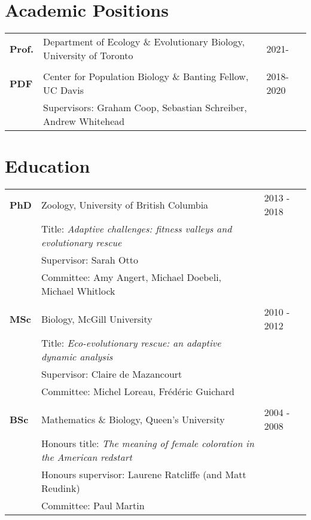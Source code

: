\documentclass[12pt]{article}
\begin{document}

\section*{Academic Positions}

\begin{tabular}{lll}
\textbf{Prof.} & Department of Ecology \& Evolutionary Biology, University of Toronto & 2021-\\
\\
\textbf{PDF} & Center for Population Biology \& Banting Fellow, UC Davis & 2018-2020\\
& Supervisors: Graham Coop, Sebastian Schreiber, Andrew Whitehead
\end{tabular}

\section*{Education}

\begin{tabular}{lll}
\textbf{PhD} & Zoology, University of British Columbia & 2013 - 2018\\
& Title: \textit{Adaptive challenges: fitness valleys and evolutionary rescue}\\
& Supervisor: Sarah Otto\\
& Committee: Amy Angert, Michael Doebeli, Michael Whitlock\\
\\
\textbf{MSc} & Biology, McGill University & 2010 - 2012 \\
& Title: \textit{Eco-evolutionary rescue: an adaptive dynamic analysis}  \\
& Supervisor: Claire de Mazancourt\\
& Committee: Michel Loreau, Fr\'{e}d\'{e}ric Guichard\\
\\
\textbf{BSc} &  Mathematics \& Biology, Queen's University & 2004 - 2008\\ %
& Honours title: \textit{The meaning of female coloration in the American redstart}  \\
& Honours supervisor: Laurene Ratcliffe (and Matt Reudink)\\
& Committee: Paul Martin\\
\end{tabular}
\end{document}
